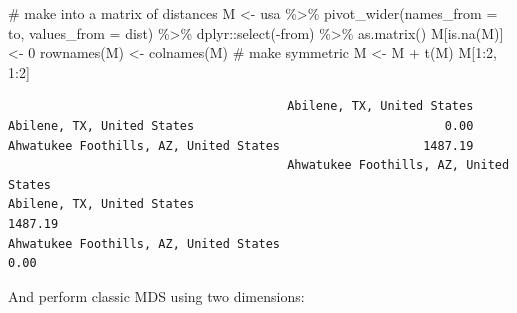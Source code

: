 \documentclass[
  letterpaper,
  DIV=11,
  numbers=noendperiod]{scrreprt}
\newenvironment{Shaded}{\begin{snugshade}}{\end{snugshade}}
\newcommand{\AttributeTok}[1]{\textcolor[rgb]{0.40,0.45,0.13}{#1}}
\newcommand{\CommentTok}[1]{\textcolor[rgb]{0.37,0.37,0.37}{#1}}
\newcommand{\DecValTok}[1]{\textcolor[rgb]{0.68,0.00,0.00}{#1}}
\newcommand{\FunctionTok}[1]{\textcolor[rgb]{0.28,0.35,0.67}{#1}}
\newcommand{\NormalTok}[1]{\textcolor[rgb]{0.00,0.23,0.31}{#1}}
\newcommand{\OtherTok}[1]{\textcolor[rgb]{0.00,0.23,0.31}{#1}}
\newcommand{\SpecialCharTok}[1]{\textcolor[rgb]{0.37,0.37,0.37}{#1}}
\newcommand{\StringTok}[1]{\textcolor[rgb]{0.13,0.47,0.30}{#1}}
\begin{document}
\begin{Shaded}
\begin{Highlighting}[]
\CommentTok{\# make into a matrix of distances}
\NormalTok{M }\OtherTok{\textless{}{-}}\NormalTok{ usa }\SpecialCharTok{\%\textgreater{}\%} \FunctionTok{pivot\_wider}\NormalTok{(}\AttributeTok{names\_from =}\NormalTok{ to, }\AttributeTok{values\_from =} \StringTok{\textasciigrave{}}\AttributeTok{dist}\StringTok{\textasciigrave{}}\NormalTok{) }\SpecialCharTok{\%\textgreater{}\%} 
\NormalTok{  dplyr}\SpecialCharTok{::}\FunctionTok{select}\NormalTok{(}\SpecialCharTok{{-}}\NormalTok{from) }\SpecialCharTok{\%\textgreater{}\%} 
  \FunctionTok{as.matrix}\NormalTok{()}
\NormalTok{M[}\FunctionTok{is.na}\NormalTok{(M)] }\OtherTok{\textless{}{-}} \DecValTok{0} 
\FunctionTok{rownames}\NormalTok{(M) }\OtherTok{\textless{}{-}} \FunctionTok{colnames}\NormalTok{(M)}
\CommentTok{\# make symmetric}
\NormalTok{M }\OtherTok{\textless{}{-}}\NormalTok{ M }\SpecialCharTok{+} \FunctionTok{t}\NormalTok{(M)}
\NormalTok{M[}\DecValTok{1}\SpecialCharTok{:}\DecValTok{2}\NormalTok{, }\DecValTok{1}\SpecialCharTok{:}\DecValTok{2}\NormalTok{]}
\end{Highlighting}
\end{Shaded}

\begin{verbatim}
                                       Abilene, TX, United States
Abilene, TX, United States                                   0.00
Ahwatukee Foothills, AZ, United States                    1487.19
                                       Ahwatukee Foothills, AZ, United States
Abilene, TX, United States                                            1487.19
Ahwatukee Foothills, AZ, United States                                   0.00
\end{verbatim}

And perform classic MDS using two dimensions:

\begin{Shaded}
\end{Shaded}
\end{document}

